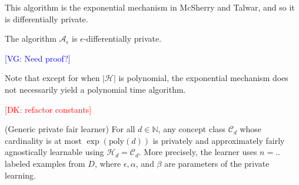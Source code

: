 \documentclass[format = sigconf]{acmart}
\newcommand{\dk}[1]{\textcolor{red}{[DK: #1]}}
\newcommand{\vg}[1]{\textcolor{blue}{[VG: #1]}}
\newcommand{\A}{\mathcal{A}}
\renewcommand{\H}{\mathcal{H}}
\renewcommand{\C}{\mathcal{C}}
\newcommand{\1}{\mathbbm{1}}
\newcommand{\eps}{\epsilon}
\theoremstyle{definition}
\begin{document}
This algorithm is the exponential mechanism in McSherry and Talwar, and so it is differentially private.

\begin{lemma}
  The algorithm $\A_\eps$ is $\eps$-differentially private.
\end{lemma}
\vg{Need proof?}

Note that except for when $|\H|$ is polynomial, the exponential mechanism does not necessarily yield a polynomial time algorithm.

\dk{refactor constants}
\begin{theorem}
	(Generic private fair learner) For all $d \in \mathbb{N}$, any concept class $\C_d$ whose cardinality is at most $\exp(\text{poly}(d))$ is privately and approximately fairly agnostically learnable using $\H_d = \C_d$. More precisely, the learner uses $n = ..$ labeled examples from $D$, where $\eps, \alpha$, and $\beta$ are parameters of the private learning.
\end{theorem}
\end{document}
